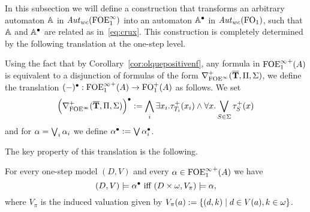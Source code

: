 
In this subsection we will define a construction that transforms an arbitrary automaton
$\mathbb{A}$ in $\mathit{Aut}_{wc}(\mathrm{FOE}^{\infty}_1)$ into an automaton $\mathbb{A}^{\bullet}$ in 
$\mathit{Aut}_{wc}(\mathrm{FO}_1)$, such that $\mathbb{A}$ and $\mathbb{A}^{\bullet}$ are related as 
in~\eqref{eq:crux}.
This construction is completely determined by the following translation at the
one-step level.

\begin{definition}
Using the fact
that by Corollary~\ref{cor:olquepositivenf}, any formula in ${\mathrm{FOE}^{\infty}_1}^+(A)$ is 
equivalent to a disjunction of formulas of the form 
$\nabla^+_{{\mathrm{FOE}}^\infty}(\overline{{\mathbf{T}}},\Pi,\Sigma)$, we define the translation 
$(-)^{\bullet} : {\mathrm{FOE}^{\infty}_1}^+(A) \to \mathrm{FO}_1^+(A)$ as follows.
We set
\[
\Big( \nabla^+_{{\mathrm{FOE}}^\infty}(\overline{{\mathbf{T}}},\Pi,\Sigma) \Big)^{\bullet} \mathrel{: =}
\bigwedge_{i} \exists x_i. \tau^+_{T_i}(x_i) \land \forall x. \bigvee_{S\in\Sigma} \tau^+_S(x)
\]
and for $\alpha = \bigvee_{i} \alpha_{i}$ we define $\alpha^{\bullet} \mathrel{: =} \bigvee 
\alpha_{i}^{\bullet}$.
\end{definition}

The key property of this translation is the following.

\begin{proposition}
\label{p-1P}
For every one-step model $(D,V)$ and every $\alpha \in {\ensuremath{\mathrm{FOE}^{\infty}_1}}^+(A)$ we have
\begin{equation}
\label{eq-1cr}
(D,V) \models \alpha^{\bullet} \text{ iff } (D\times \om,V_\pi) \models \alpha,
\end{equation}
where $V_{\pi}$ %
 is the induced valuation given by 
$V_{\pi}(a) \mathrel{: =} \{ (d,k) \mid d \in V(a), k\in\omega\}$.
\end{proposition}

